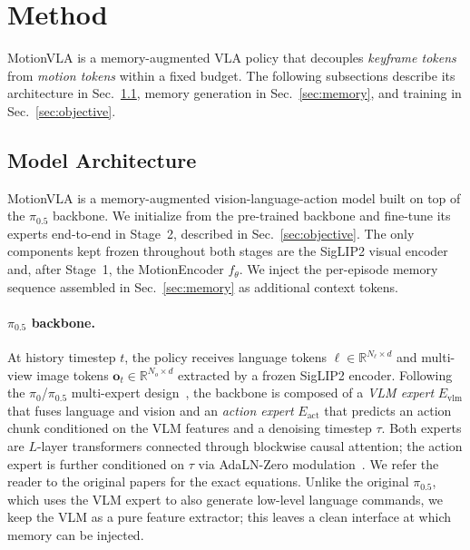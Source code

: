 \documentclass{article}
\begin{document}
\section{Method}
\label{sec:method}

MotionVLA is a memory-augmented VLA policy that decouples \emph{keyframe tokens} from \emph{motion tokens} within a fixed budget. The following subsections describe its architecture in Sec.~\ref{sec:arch}, memory generation in Sec.~\ref{sec:memory}, and training in Sec.~\ref{sec:objective}.


\subsection{Model Architecture}
\label{sec:arch}

MotionVLA is a memory-augmented vision-language-action model built on
top of the $\pi_{0.5}$ backbone. We initialize from the pre-trained backbone
and fine-tune its experts end-to-end in Stage~2, described in Sec.~\ref{sec:objective}.
The only components kept frozen throughout both stages are the SigLIP2 visual
encoder and, after Stage~1, the MotionEncoder $f_\theta$.
We inject the per-episode memory sequence assembled in
Sec.~\ref{sec:memory} as additional context tokens.

\paragraph{$\pi_{0.5}$ backbone.}
At history timestep $t$, the policy receives language tokens
$\boldsymbol{\ell} \in \mathbb{R}^{N_\ell\times d}$ and multi-view image
tokens $\mathbf{o}_t \in \mathbb{R}^{N_o\times d}$ extracted by a frozen
SigLIP2 encoder. Following the $\pi_0$/$\pi_{0.5}$ multi-expert
design~\citep{black2024pi0,black2025pi05}, the backbone is composed of a
\emph{VLM expert} $E_{\mathrm{vlm}}$ that fuses language and vision and an
\emph{action expert} $E_{\mathrm{act}}$ that predicts an action chunk
conditioned on the VLM features and a denoising timestep $\tau$. Both
experts are $L$-layer transformers connected through blockwise causal
attention; the action expert is further conditioned on $\tau$ via
AdaLN-Zero modulation~\citep{peebles2023scalable}. We refer the reader to
the original papers for the exact equations. Unlike the original
$\pi_{0.5}$, which uses the VLM expert to also generate low-level language
commands, we keep the VLM as a pure feature extractor; this leaves a clean
interface at which memory can be injected.
\end{document}
